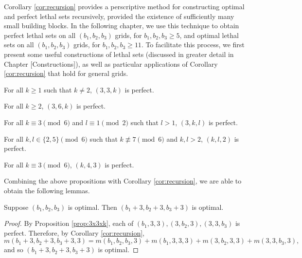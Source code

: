 Corollary \ref{cor:recursion} provides a perscriptive method for constructing optimal and perfect lethal sets recursively, provided the existence of sufficiently many small building blocks. In the following chapter, we use this technique to obtain perfect lethal sets on all $(b_1,b_2,b_3)$ grids, for $b_1,b_2,b_3 \geq 5$, and optimal lethal sets on all $(b_1,b_2,b_3)$ grids, for $b_1,b_2,b_3 \geq 11$. To facilitate this process, we first present some useful constructions of lethal sets (discussed in greater detail in Chapter [Constructions]), as well as particular applications of Corollary \ref{cor:recursion} that hold for general grids. 

\begin{prop}
\label{prop:3x3xk}
For all $k \geq 1$ such that $k \neq 2$, $(3,3,k)$ is perfect.
\end{prop}

\begin{prop}
\label{prop:3x6xk}
For all $k \geq 2$, $(3,6,k)$ is perfect.
\end{prop}

\begin{prop}
\label{prop:thickness_3_2d_family}
For all $k \equiv 3 \pmod 6$ and $l \equiv 1 \pmod 2$ such that $l >1$, $(3,k,l)$ is perfect.
\end{prop}

\begin{prop}
\label{prop:thickness_2_2d_family}
For all $k,l \in \{2,5\} \pmod 6$ such that $k \not\equiv 7 \pmod 6$ and $k,l > 2$, $(k,l,2)$ is perfect.
\end{prop}

\begin{prop}
\label{prop:thickness_3_width_4}
For all $k \equiv 3 \pmod 6$, $(k,4,3)$ is perfect.
\end{prop}

Combining the above propositions with Corollary \ref{cor:recursion}, we are able to obtain the following lemmas.

\begin{lem}
Suppose $(b_1, b_2, b_3)$ is optimal. Then $(b_1+3, b_2+3, b_3+3)$ is optimal. 
\end{lem}

\begin{proof}
By Proposition \ref{prop:3x3xk}, each of $(b_1,3,3), (3,b_2,3),(3,3,b_3)$ is perfect. Therefore, by Corollary \ref{cor:recursion}, 
$$m(b_1+3, b_2+3, b_3+3, 3) = m(b_1,b_2,b_3,3) + m(b_1,3,3,3) + m(3,b_2,3,3) + m(3,3,b_3,3),$$
and so $(b_1+3, b_2+3, b_3+3)$ is optimal.
\end{proof}

